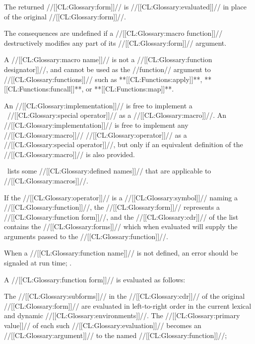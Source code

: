 The returned //[[CL:Glossary:form]]// is //[[CL:Glossary:evaluated]]// in place of the original //[[CL:Glossary:form]]//.

 The consequences are undefined if a //[[CL:Glossary:macro function]]// destructively modifies any part of its //[[CL:Glossary:form]]// argument.

A //[[CL:Glossary:macro name]]// is not a //[[CL:Glossary:function designator]]//, and cannot be used as the //function// argument to //[[CL:Glossary:functions]]//  such as **[[CL:Functions:apply]]**, **[[CL:Functions:funcall]]**, or **[[CL:Functions:map]]**.

An //[[CL:Glossary:implementation]]// is free to implement a \clisp\ //[[CL:Glossary:special operator]]// as a //[[CL:Glossary:macro]]//.  An //[[CL:Glossary:implementation]]// is free to implement any //[[CL:Glossary:macro]]// //[[CL:Glossary:operator]]// as a //[[CL:Glossary:special operator]]//, but only if an equivalent definition of the //[[CL:Glossary:macro]]// is also provided.

\Thenextfigure\ lists some //[[CL:Glossary:defined names]]// that are applicable to //[[CL:Glossary:macros]]//.


\endsubsubsubsubsection%

 

If the //[[CL:Glossary:operator]]// is a //[[CL:Glossary:symbol]]// naming a //[[CL:Glossary:function]]//, the //[[CL:Glossary:form]]// represents a //[[CL:Glossary:function form]]//, and the //[[CL:Glossary:cdr]]// of the list contains the //[[CL:Glossary:forms]]//  which when evaluated will supply the arguments passed to the //[[CL:Glossary:function]]//.

When a //[[CL:Glossary:function name]]// is not defined,  an error  should be signaled at run time; \seesection\SemanticConstraints.

A //[[CL:Glossary:function form]]// is evaluated as follows:

The //[[CL:Glossary:subforms]]// in the //[[CL:Glossary:cdr]]// of the original //[[CL:Glossary:form]]// are evaluated in left-to-right order in the current lexical and  dynamic //[[CL:Glossary:environments]]//.  The //[[CL:Glossary:primary value]]// of each such //[[CL:Glossary:evaluation]]// becomes an //[[CL:Glossary:argument]]// to the named //[[CL:Glossary:function]]//;

